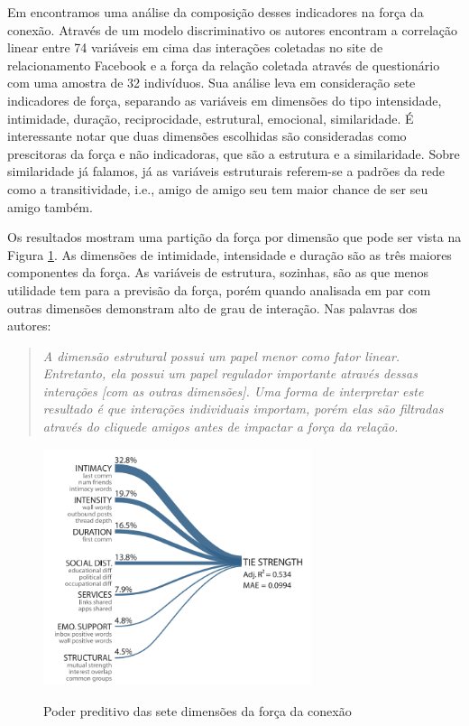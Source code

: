 \documentclass{article}
\begin{document}
Em \cite{Gilbert2009} encontramos uma análise da composição desses indicadores na
força da conexão. Através de um modelo discriminativo os autores encontram a
correlação linear entre 74 variáveis em cima das interações coletadas no site de
relacionamento Facebook e a força da relação coletada através de questionário com
uma amostra de 32 indivíduos. Sua análise leva em consideração sete indicadores
de força, separando as variáveis em dimensões do tipo intensidade, intimidade,
duração, reciprocidade, estrutural, emocional, similaridade. É interessante
notar que duas dimensões escolhidas são consideradas como prescitoras da força e
não indicadoras, que são a estrutura e a similaridade. Sobre similaridade já
falamos, já as variáveis estruturais referem-se a padrões da rede como a
transitividade, i.e., amigo de amigo seu tem maior chance de ser seu amigo
também.

Os resultados mostram uma partição da força por dimensão que pode ser vista na
Figura \ref{fig:forca}. As dimensões de intimidade, intensidade e duração são as
três maiores componentes da força. As variáveis de estrutura, sozinhas, são as
que menos utilidade tem para a previsão da força, porém quando analisada em par
com outras dimensões demonstram alto de grau de interação. Nas palavras dos
autores:

\begin{quotation}
\textit{A dimensão estrutural possui um papel menor como fator linear.
Entretanto, ela possui um papel regulador importante através dessas interações
[com as outras dimensões]. Uma forma de interpretar este resultado é que
interações individuais importam, porém elas são filtradas através do
clique\footnotemark de amigos antes de impactar a força da
relação.}\cite{Gilbert2009}
\end{quotation}


\begin{figure}[h!]
  \caption{Poder preditivo das sete dimensões da força da conexão}
  \centering
    \includegraphics[width=0.7\textwidth]{imgs/composicao-forca.png}
    \label{fig:forca}
\end{figure}
\end{document}
